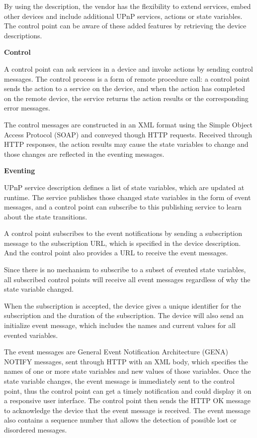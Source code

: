 By using the description, the vendor has the flexibility to extend services, embed other devices and include 
additional UPnP services, actions or state variables. The control point can be
aware of these added features by retrieving the device descriptions.

\textbf{Control} 

A control point can ask services in a device and invoke actions by sending
control messages. The control process is a form of remote procedure call: a
control point sends the action to a service on the device, and when the action has completed on the remote device, the service returns the action results or the corresponding error messages.

The control messages are constructed in an XML format using the Simple Object
Access Protocol (SOAP) and conveyed though HTTP requests. Received through HTTP
responses, the action results may cause the state variables to change and those changes are reflected in the eventing messages.

\textbf{Eventing}

UPnP service description defines a list of state variables, which are updated at runtime. The service 
publishes those changed state variables in the form of event messages, and a control point can 
subscribe to this publishing service to learn about the state transitions.

A control point subscribes to the event notifications by sending a subscription message to the 
subscription URL, which is specified in the device description. And the control
point also provides a URL to receive the event messages.

Since there is no mechanism to subscribe to a subset of evented state variables, all subscribed 
control points will receive all event messages regardless of why the state
variable changed.

When the subscription is accepted, the device gives a unique identifier for the subscription and 
the duration of the subscription. The device will also send an initialize event message, which 
includes the names and current values for all evented variables.

The event messages are General Event Notification Architecture (GENA) NOTIFY 
messages, sent through HTTP with an XML body, which specifies the names of one
or more state variables and new values of those variables. Once the state variable 
changes, the event message is immediately sent to the control point, thus the 
control point can get a timely notification and could display it on a responsive
user interface. The control point then sends the HTTP OK message to acknowledge the device 
that the event message is received. The event message also contains a sequence 
number that allows the detection of possible lost or disordered messages.

